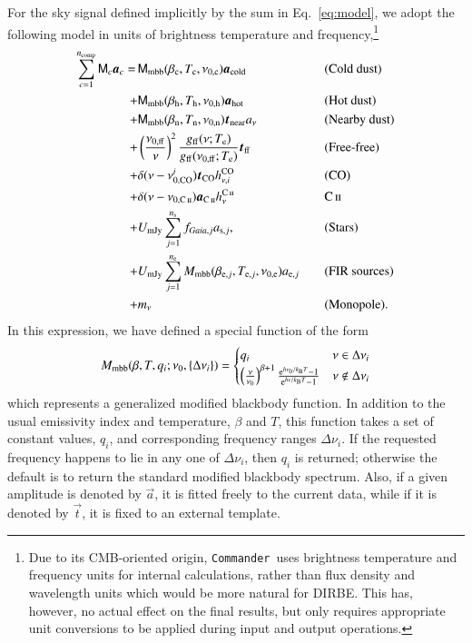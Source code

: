 \documentclass{aa}
\def\commander{\texttt{Commander}}
\def\GAIA{\textit{Gaia}}
\newcommand{\CII}{\ensuremath{\textsc{C\,ii}}}
\renewcommand{\t}[0]{\vec{t}}
\renewcommand{\a}[0]{\vec{a}}
\newcommand{\M}[0]{\tens{M}}
\newcommand{\Te}[0]{T_{\rm e}}
\newcommand{\e}{\mathrm e}
\def\Tcold{\ifmmode T_\mathrm{c}\else $T_{\mathrm{c}}$\fi}
\def\Thot{\ifmmode T_\mathrm{h}\else $T_{\mathrm{h}}$\fi}
\def\Tnear{\ifmmode T_\mathrm{n}\else $T_{\mathrm{n}}$\fi}
\def\bcold{\ifmmode \beta_\mathrm{c}\else $\beta_{\mathrm{c}}$\fi}
\def\bhot{\ifmmode \beta_\mathrm{h}\else $\beta_{\mathrm{h}}$\fi}
\def\bnear{\ifmmode \beta_\mathrm{n}\else $\beta_{\mathrm{n}}$\fi}
\def\nuzeroff{\ifmmode \nu_{0,\mathrm{ff}}\else $\nu_{0,\mathrm{ff}}$\fi}
\def\nuzerocold{\ifmmode \nu_{0,\mathrm{c}}\else $\nu_{0,\mathrm{c}}$\fi}
\def\nuzerohot{\ifmmode \nu_{0,\mathrm{h}}\else $\nu_{0,\mathrm{h}}$\fi}
\def\nuzeronear{\ifmmode \nu_{0,\mathrm{n}}\else $\nu_{0,\mathrm{n}}$\fi}
\def\Te{\ifmmode T_{\mathrm{e}}\else $T_{\mathrm{e}}$\fi}
\def\kB{\ifmmode k_\mathrm{B}\else $k_{\mathrm{B}}$\fi}
\begin{document}
For the sky signal defined implicitly by the sum in
Eq.~\eqref{eq:model}, we adopt the following model in units of
brightness temperature and frequency,\footnote{Due to its CMB-oriented
origin, \commander\ uses brightness temperature and frequency units
for internal calculations, rather than flux density and wavelength
units which would be more natural for DIRBE. This has, however, no
actual effect on the final results, but only requires appropriate unit
conversions to be applied during input and output operations. }
\begin{alignat}{4}
  \sum_{c=1}^{n_{\mathrm{comp}}} \M_c \a_c  = \,
  &\M_{\mathrm{mbb}}(\bcold,\Tcold,\nuzerocold)\vec{a}_{\mathrm{cold}}
  && \textrm{(Cold dust)}\label{eq:skymodel}\\
  + &\M_{\mathrm{mbb}}(\bhot,\Thot,\nuzerohot)
  \vec{a}_{\mathrm{hot}} && \textrm{(Hot dust)}\nonumber \\
  + &\M_{\mathrm{mbb}}(\bnear,\Tnear,\nuzeronear) \t_{\mathrm{near}}
  a_{\nu} && \textrm{(Nearby dust)} \nonumber \\
  + &\left(\frac{\nuzeroff}{\nu}\right)^2
  \frac{g_{\mathrm{ff}}(\nu;\Te) }{g_{\mathrm{ff}}(\nuzeroff;\Te)}
  \vec{t}_{\mathrm{ff}} && \textrm{(Free-free)} \nonumber\\
  + &\delta(\nu-\nu_{0,\mathrm{CO}}^i) \t_{\mathrm{CO}}
  h^{\mathrm{CO}}_{\nu,i} && \textrm{(CO)}\nonumber\\
	+ &\delta(\nu-\nu_{0,\CII}) \a_{\CII}
  h^{\CII}_{\nu} && \CII\nonumber \\
  + &U_{\mathrm{mJy}} \sum_{j=1}^{n_{\mathrm{s}}}
  f_{\GAIA,j} a_{\mathrm{s},j}, &\quad&
  \textrm{(Stars)} \nonumber\\
    + &U_{\mathrm{mJy}} \sum_{j=1}^{n_{\mathrm{e}}}
  M_{\mathrm{mbb}}(\beta_{\mathrm{e},j},
  T_{\mathrm{e},j}, \nu_{0,\mathrm{e}})
  a_{\mathrm{e},j} && \textrm{(FIR sources)}\nonumber\\
  + &m_{\nu} && \textrm{(Monopole)}. \nonumber
\end{alignat}
In this expression, we have defined a special function of the form
\begin{equation}
  M_{\mathrm{mbb}}(\beta, T, q_i;\nu_0, \{\Delta\nu_i\}) =
    \begin{cases}
      q_i & \nu \in \Delta\nu_i\\
      \left(\frac{\nu}{\nu_0}\right)^{\beta+1}
  \frac{\e^{h\nu_0/\kB T}-1}{\e^{h\nu/\kB T}-1} & \nu \notin \Delta\nu_i
    \end{cases}       
\end{equation}
which represents a generalized modified blackbody function. In
addition to the usual emissivity index and temperature, $\beta$ and
$T$, this function takes a set of constant values, $q_i$, and
corresponding frequency ranges $\Delta\nu_i$. If the requested
frequency happens to lie in any one of $\Delta\nu_i$, then $q_i$ is
returned; otherwise the default is to return the standard modified
blackbody spectrum. Also, if a given amplitude is denoted by $\a$, it
is fitted freely to the current data, while if it is denoted by $\t$,
it is fixed to an external template.
\end{document}
